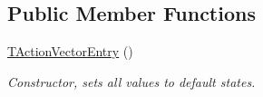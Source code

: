 \subsection*{Public Member Functions}
\begin{DoxyCompactItemize}
\item 
\mbox{\label{class_t_action_vector_entry_a2f3969c630acb3f7a346ced7a601502f}} 
\mbox{\hyperlink{class_t_action_vector_entry_a2f3969c630acb3f7a346ced7a601502f}{T\+Action\+Vector\+Entry}} ()
\begin{DoxyCompactList}\small\item\em Constructor, sets all values to default states. \end{DoxyCompactList}\end{DoxyCompactItemize}
